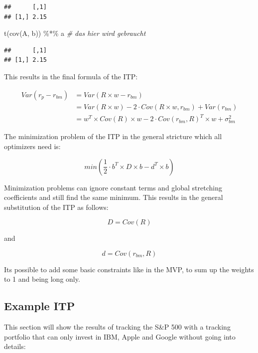 \documentclass[
  oneside]{book}
\newenvironment{Shaded}{\begin{snugshade}}{\end{snugshade}}
\newcommand{\CommentTok}[1]{\textcolor[rgb]{0.56,0.35,0.01}{\textit{#1}}}
\newcommand{\FunctionTok}[1]{\textcolor[rgb]{0.00,0.00,0.00}{#1}}
\newcommand{\NormalTok}[1]{#1}
\newcommand{\SpecialCharTok}[1]{\textcolor[rgb]{0.00,0.00,0.00}{#1}}
\begin{document}
\begin{verbatim}
##      [,1]
## [1,] 2.15
\end{verbatim}

\begin{Shaded}
\begin{Highlighting}[]
\FunctionTok{t}\NormalTok{(}\FunctionTok{cov}\NormalTok{(A, b)) }\SpecialCharTok{\%*\%}\NormalTok{ a }\CommentTok{\# das hier wird gebraucht}
\end{Highlighting}
\end{Shaded}

\begin{verbatim}
##      [,1]
## [1,] 2.15
\end{verbatim}

This results in the final formula of the ITP:

\begin{equation}
  \begin{split}
   Var(r_{p}-r_{bm}) & = Var(R \times w - r_{bm}) \\
   & = Var(R \times w) - 2 \cdot Cov(R \times w,r_{bm}) + Var(r_{bm})  \\
   & = w^T \times Cov(R) \times w - 2 \cdot Cov(r_{bm}, R)^T \times w + \sigma_{bm}^2
   \end{split}
   \label{eq:ITP}
\end{equation}

The minimization problem of the ITP in the general stricture which all optimizers need is:

\[
  min(\frac{1}{2} \cdot b^T \times D \times b -d^T \times b)
\]

Minimization problems can ignore constant terms and global stretching coefficients and still find the same minimum. This results in the general substitution of the ITP as follows:

\[
  D = Cov(R)
\]

and

\[
d = Cov(r_{bm}, R)
\]

Its possible to add some basic constraints like in the MVP, to sum up the weights to 1 and being long only.

\hypertarget{example-itp}{%
\subsection{Example ITP}\label{example-itp}}

This section will show the results of tracking the S\&P 500 with a tracking portfolio that can only invest in IBM, Apple and Google without going into details:
\end{document}
